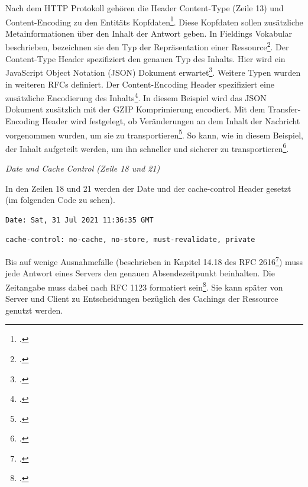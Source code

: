 Nach dem HTTP Protokoll gehören die Header Content-Type (Zeile 13) und Content-Encoding zu den Entitäts Kopfdaten\footcite[S. 42]{fielding_hypertext_1999}. Diese Kopfdaten sollen zusätzliche Metainformationen über den Inhalt der Antwort geben. In Fieldings Vokabular beschrieben, bezeichnen sie den Typ der Repräsentation einer Ressource\footcite[S. 88ff]{fielding_architectural_2000}. Der Content-Type Header spezifiziert den genauen Typ des Inhalts. Hier wird ein JavaScript Object Notation (JSON) Dokument erwartet\footcite[S. 1]{crockford_applicationjson_2006}. Weitere Typen wurden in weiteren RFCs definiert. Der Content-Encoding Header spezifiziert eine zusätzliche Encodierung des Inhalts\footcite[S. 168]{berners-lee_univeral_1996}. In diesem Beispiel wird das JSON Dokument zusätzlich mit der GZIP Komprimierung encodiert. Mit dem Transfer-Encoding Header wird festgelegt, ob Veränderungen an dem Inhalt der Nachricht vorgenommen wurden, um sie zu transportieren\footcite[S. 143]{berners-lee_univeral_1996}. So kann, wie in diesem Beispiel, der Inhalt aufgeteilt werden, um ihn schneller und sicherer zu transportieren\footcite[S. 143]{berners-lee_univeral_1996}.

\emph{Date und Cache Control (Zeile 18 und 21)}

In den Zeilen 18 und 21 werden der Date und der cache-control Header gesetzt (im folgenden Code zu sehen).

\lstset{firstnumber=18}
\begin{lstlisting}
Date: Sat, 31 Jul 2021 11:36:35 GMT
\end{lstlisting}

\lstset{firstnumber=21}
\begin{lstlisting}
cache-control: no-cache, no-store, must-revalidate, private
\end{lstlisting}

Bis auf wenige Ausnahmefälle (beschrieben in Kapitel 14.18 des RFC 2616\footcite[S. 124]{berners-lee_univeral_1996}) muss jede Antwort eines Servers den genauen Absendezeitpunkt beinhalten. Die Zeitangabe muss dabei nach RFC 1123 formatiert sein\footcite[S. 124]{berners-lee_univeral_1996}. Sie kann später von Server und Client zu Entscheidungen bezüglich des Cachings der Ressource genutzt werden.

